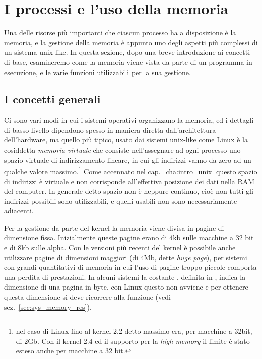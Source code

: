 \section{I processi e l'uso della memoria}
\label{sec:proc_memory}

Una delle risorse più importanti che ciascun processo ha a disposizione è la
memoria, e la gestione della memoria è appunto uno degli aspetti più complessi
di un sistema unix-like. In questa sezione, dopo una breve introduzione ai
concetti di base, esamineremo come la memoria viene vista da parte di un
programma in esecuzione, e le varie funzioni utilizzabili per la sua gestione.


\subsection{I concetti generali}
\label{sec:proc_mem_gen}


Ci sono vari modi in cui i sistemi operativi organizzano la memoria, ed i
dettagli di basso livello dipendono spesso in maniera diretta
dall'architettura dell'hardware, ma quello più tipico, usato dai sistemi
unix-like come Linux è la cosiddetta \textsl{memoria virtuale} che consiste
nell'assegnare ad ogni processo uno spazio virtuale di indirizzamento lineare,
in cui gli indirizzi vanno da zero ad un qualche valore massimo.\footnote{nel
  caso di Linux fino al kernel 2.2 detto massimo era, per macchine a 32bit, di
  2Gb. Con il kernel 2.4 ed il supporto per la \textit{high-memory} il limite
  è stato esteso anche per macchine a 32 bit.}  Come accennato nel
cap.~\ref{cha:intro_unix} questo spazio di indirizzi è virtuale e non
corrisponde all'effettiva posizione dei dati nella RAM del computer. In
generale detto spazio non è neppure continuo, cioè non tutti gli indirizzi
possibili sono utilizzabili, e quelli usabili non sono necessariamente
adiacenti.


Per la gestione da parte del kernel la memoria viene divisa in pagine di
dimensione fissa. Inizialmente queste pagine erano di 4kb sulle macchine a 32
bit e di 8kb sulle alpha. Con le versioni più recenti del kernel è possibile
anche utilizzare pagine di dimensioni maggiori (di 4Mb, dette \textit{huge
  page}), per sistemi con grandi quantitativi di memoria in cui l'uso di
pagine troppo piccole comporta una perdita di prestazioni. In alcuni sistemi
la costante , definita in , indica la
dimensione di una pagina in byte, con Linux questo non avviene e per ottenere
questa dimensione si deve ricorrere alla funzione  (vedi
sez.~\ref{sec:sys_memory_res}).


